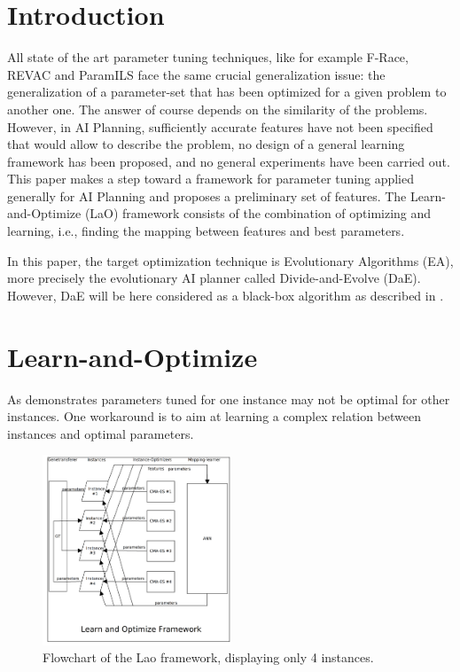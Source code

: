 \documentclass{MYsig-alternate}
\begin{document}



\section{Introduction}

All state of the art parameter tuning techniques, like for example F-Race, REVAC and ParamILS \cite{Montero:2010} face the same crucial generalization issue: the generalization of a parameter-set that has been optimized for a given problem to another one. The answer of course depends on the similarity of the problems. However, in AI Planning, sufficiently accurate features have not been specified that would allow to describe the problem, no design of a general learning framework has been proposed, and no general experiments have been carried out. This paper makes a step toward a framework for parameter tuning applied generally for AI Planning and proposes a preliminary set of features. The Learn-and-Optimize (LaO) framework consists of the combination of optimizing and learning, i.e., finding the mapping between features and best parameters.

In this paper, the target optimization technique is Evolutionary Algorithms (EA), more precisely the evolutionary AI planner called Divide-and-Evolve (DaE). However, DaE will be here considered as a black-box algorithm as described in \cite{BibEvoCop:2010}. 

\section{Learn-and-Optimize}
\label{section:LaO}

As \cite{BibGECCO:2010} demonstrates parameters tuned for one instance may not be optimal for other instances. One workaround is to aim at learning a complex relation between instances and optimal parameters.

\begin{figure}[h!]
  \centering
    \includegraphics[width=0.5\textwidth]{lao.png}
  \caption{Flowchart of the Lao framework, displaying only 4 instances.}
\label{figure:laoflowchart}
\end{figure}
\end{document}
